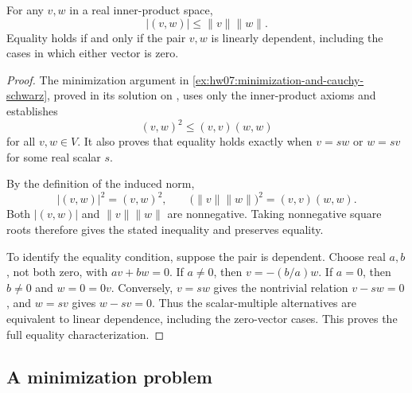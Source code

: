\begin{theorem}
  \label{thm:linear-algebra-i:cauchy-schwarz}
  For any \(v,w\) in a real inner-product space,
  \[
    \lvert(v,w)\rvert\le\lVert v\rVert\lVert w\rVert.
  \]
  Equality holds if and only if the pair \(v,w\) is linearly dependent,
  including the cases in which either vector is zero.
\end{theorem}
\begin{pendingreview}
\begin{proof}
  The minimization argument in
  \autoref{ex:hw07:minimization-and-cauchy-schwarz}, proved in its
  solution on ,
  uses only the inner-product axioms and establishes
  \[
    (v,w)^2\leq(v,v)(w,w)
  \]
  for all \(v,w\in V\). It also proves that equality holds exactly
  when \(v=sw\) or \(w=sv\) for some real scalar \(s\).

  By the definition of the induced norm,
  \[
    \lvert(v,w)\rvert^2=(v,w)^2,
    \qquad
    \bigl(\lVert v\rVert\lVert w\rVert\bigr)^2=(v,v)(w,w).
  \]
  Both \(\lvert(v,w)\rvert\) and
  \(\lVert v\rVert\lVert w\rVert\) are nonnegative. Taking
  nonnegative square roots therefore gives the stated inequality and
  preserves equality.

  To identify the equality condition, suppose the pair is dependent.
  Choose real \(a,b\), not both zero, with \(av+bw=0\).
  If \(a\ne0\), then \(v=-(b/a)w\). If \(a=0\), then
  \(b\ne0\) and \(w=0=0v\). Conversely, \(v=sw\) gives the
  nontrivial relation \(v-sw=0\), and \(w=sv\) gives
  \(w-sv=0\). Thus the scalar-multiple alternatives are equivalent
  to linear dependence, including the zero-vector cases. This proves
  the full equality characterization.
\end{proof}
\end{pendingreview}

\newpage
\subsection{A minimization problem}

